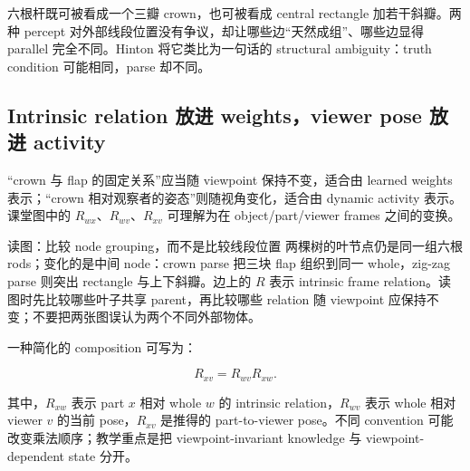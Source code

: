 六根杆既可被看成一个三瓣 crown，也可被看成 central rectangle 加若干斜瓣。两种 percept 对外部线段位置没有争议，却让哪些边“天然成组”、哪些边显得 parallel 完全不同。Hinton 将它类比为一句话的 structural ambiguity：truth condition 可能相同，parse 却不同。




\subsection{Intrinsic relation 放进 weights，viewer pose 放进 activity}

“crown 与 flap 的固定关系”应当随 viewpoint 保持不变，适合由 learned weights 表示；“crown 相对观察者的姿态”则随视角变化，适合由 dynamic activity 表示。课堂图中的 $R_{wx}$、$R_{wv}$、$R_{xv}$ 可理解为在 object/part/viewer frames 之间的变换。



\begin{knowledgebox}{读图：比较 node grouping，而不是比较线段位置}
两棵树的叶节点仍是同一组六根 rods；变化的是中间 node：crown parse 把三块 flap 组织到同一 whole，zig-zag parse 则突出 rectangle 与上下斜瓣。边上的 $R$ 表示 intrinsic frame relation。读图时先比较哪些叶子共享 parent，再比较哪些 relation 随 viewpoint 应保持不变；不要把两张图误认为两个不同外部物体。
\end{knowledgebox}

一种简化的 composition 可写为：

\[
R_{xv}=R_{wv}R_{xw}.
\]

其中，$R_{xw}$ 表示 part $x$ 相对 whole $w$ 的 intrinsic relation，$R_{wv}$ 表示 whole 相对 viewer $v$ 的当前 pose，$R_{xv}$ 是推得的 part-to-viewer pose。不同 convention 可能改变乘法顺序；教学重点是把 viewpoint-invariant knowledge 与 viewpoint-dependent state 分开。

